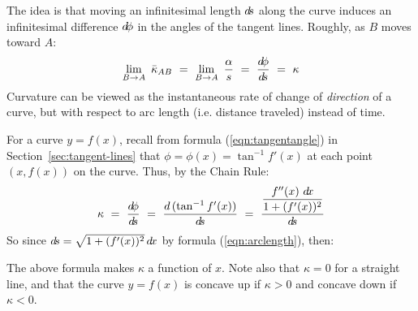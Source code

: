 
\noindent The idea is that moving an infinitesimal length $d\!s$ along the curve
induces an infinitesimal difference $d\!\phi$ in the angles of the tangent lines.
Roughly, as $B$ moves toward $A$:
\[
\lim_{B \to A}~\bar{\kappa}_{AB} ~=~ \lim_{B \to A}~ \frac{\alpha}{s} ~=~
\frac{d\!\phi}{d\!s} ~=~ \kappa
\]
Curvature can be viewed as the instantaneous rate of change of \emph{direction}
of a curve, but with respect to arc length (i.e. distance traveled) instead of
time.

For a curve $y=f(x)$, recall from formula (\ref{eqn:tangentangle}) in Section~\ref{sec:tangent-lines}
that $\phi = \phi(x) = \tan^{-1} f'(x)$ at each point
$(x,f(x))$ on the curve. Thus, by the Chain Rule:
\[
\kappa ~=~ \frac{d\!\phi}{d\!s} ~=~ \frac{d\,(\tan^{-1} f'(x))}{d\!s} ~=~
\frac{\dfrac{f''(x)~d\!x}{1 + (f'(x))^2}}{d\!s}
\]
So since $d\!s=\sqrt{1 + (f'(x))^2}\,d\!x$ by formula (\ref{eqn:arclength}), then:


\noindent The above formula makes $\kappa$ a function of $x$. Note also that
$\kappa=0$ for a straight line, and that the curve $y=f(x)$  is concave up if
$\kappa > 0$ and concave down if $\kappa < 0$. 

